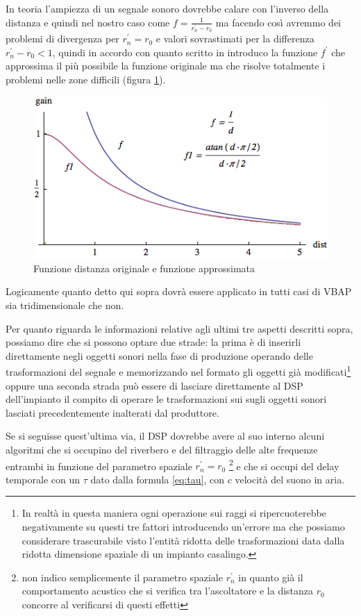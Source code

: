 \documentclass[12pt,a4paper]{report}
\begin{document}
In teoria l'ampiezza di un segnale sonoro dovrebbe calare con l'inverso della distanza e quindi nel nostro caso come $f=\frac{1}{r_n^{\prime}-r_0}$ ma facendo così avremmo dei problemi di divergenza per $r_n^{\prime}=r_0$ e valori sovrastimati per la differenza $r_n^{\prime}-r_0<1$, quindi in accordo con quanto scritto in \cite{distanza} introduco la funzione $f^{\prime}$ che approssima il più possibile la funzione originale ma che risolve totalmente i problemi nelle zone difficili (figura \ref{fig:distance}).

\begin{figure}[htbp]
	\centering
	\includegraphics[scale=0.60]{figures/distance.png}
	\caption {Funzione distanza originale e funzione approssimata}
	\label{fig:distance}
	\end{figure}

Logicamente quanto detto qui sopra dovrà essere applicato in tutti casi di VBAP sia tridimensionale che non.

Per quanto riguarda le informazioni relative agli ultimi tre aspetti descritti sopra, possiamo dire che si possono optare due strade: la prima è di inserirli direttamente negli oggetti sonori nella fase di produzione operando delle trasformazioni del segnale e memorizzando nel formato gli oggetti già modificati\footnote{In realtà in questa maniera ogni operazione sui raggi si ripercuoterebbe negativamente su questi tre fattori introducendo un'errore ma che possiamo considerare trascurabile visto l'entità ridotta delle trasformazioni data dalla ridotta dimensione spaziale di un impianto casalingo.} oppure una seconda strada può essere di lasciare direttamente al DSP dell'impianto il compito di operare le trasformazioni sui sugli oggetti sonori lasciati precedentemente inalterati dal produttore.

Se si seguisse quest'ultima via, il DSP dovrebbe avere al suo interno alcuni algoritmi che si occupino del riverbero e del filtraggio delle alte frequenze entrambi in funzione del parametro spaziale $r_n^{\prime}=r_0$  \footnote{non indico semplicemente il parametro spaziale $r_n^{\prime}$ in quanto già il comportamento acustico che si verifica tra l'ascoltatore e la distanza $r_0$ concorre al verificarsi di questi effetti} e che si occupi del delay temporale   con un $\tau$ dato dalla formula \ref{eq:tau}, con $c$ velocità del suono in aria.
\end{document}
